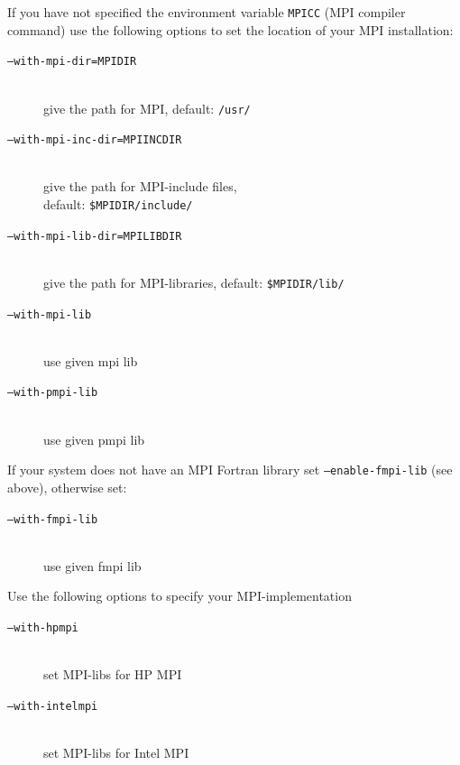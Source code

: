 \documentclass[a4paper,twoside,12pt,BCOR12mm]{scrbook}
\begin{document}
\begin{latexonly}
\noindent If you have not specified the environment variable \texttt{MPICC}
(MPI compiler command) use the following options to set the location
of your MPI installation:

\begin{description}
\item[\texttt{--with-mpi-dir=MPIDIR}] ~\\
                              give the path for MPI, default: \texttt{/usr/}

\item[\texttt{--with-mpi-inc-dir=MPIINCDIR}] ~\\
                              give the path for MPI-include files, \\
                              default: \texttt{\$MPIDIR/include/}

\item[\texttt{--with-mpi-lib-dir=MPILIBDIR}] ~\\
                              give the path for MPI-libraries, default: \texttt{\$MPIDIR/lib/}

\item[\texttt{--with-mpi-lib}] ~\\
                              use given mpi lib

\item[\texttt{--with-pmpi-lib}] ~\\
                              use given pmpi lib
\end{description}

\noindent If your system does not have an MPI Fortran library
set \texttt{--enable-fmpi-lib} (see above), otherwise set:

\begin{description}

\item[\texttt{--with-fmpi-lib}] ~\\
                              use given fmpi lib

\end{description}

\noindent Use the following options to specify your MPI-implementation

\begin{description}

\item[\texttt{--with-hpmpi}] ~\\
                              set MPI-libs for HP MPI

\item[\texttt{--with-intelmpi}] ~\\
                              set MPI-libs for Intel MPI


\end{description}
\end{latexonly}
\end{document}
